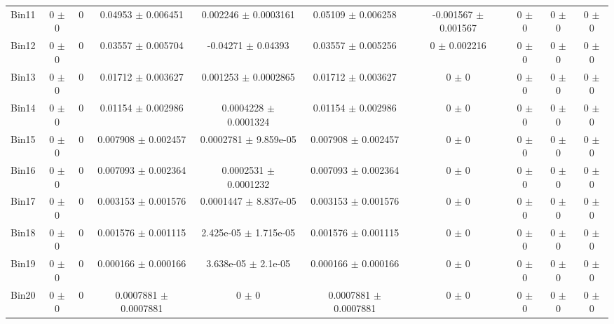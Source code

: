 \begin{tabular}{@{\extracolsep{4pt}}lccccccccc@{}}
     Bin11 & 0 $\pm$ 0 & 0 & 0.04953 $\pm$ 0.006451 & 0.002246 $\pm$ 0.0003161 & 0.05109 $\pm$ 0.006258 & -0.001567 $\pm$ 0.001567 & 0 $\pm$ 0 & 0 $\pm$ 0 & 0 $\pm$ 0 \\ 
     Bin12 & 0 $\pm$ 0 & 0 & 0.03557 $\pm$ 0.005704 & -0.04271 $\pm$ 0.04393 & 0.03557 $\pm$ 0.005256 & 0 $\pm$ 0.002216 & 0 $\pm$ 0 & 0 $\pm$ 0 & 0 $\pm$ 0 \\ 
     Bin13 & 0 $\pm$ 0 & 0 & 0.01712 $\pm$ 0.003627 & 0.001253 $\pm$ 0.0002865 & 0.01712 $\pm$ 0.003627 & 0 $\pm$ 0 & 0 $\pm$ 0 & 0 $\pm$ 0 & 0 $\pm$ 0 \\ 
     Bin14 & 0 $\pm$ 0 & 0 & 0.01154 $\pm$ 0.002986 & 0.0004228 $\pm$ 0.0001324 & 0.01154 $\pm$ 0.002986 & 0 $\pm$ 0 & 0 $\pm$ 0 & 0 $\pm$ 0 & 0 $\pm$ 0 \\ 
     Bin15 & 0 $\pm$ 0 & 0 & 0.007908 $\pm$ 0.002457 & 0.0002781 $\pm$ 9.859e-05 & 0.007908 $\pm$ 0.002457 & 0 $\pm$ 0 & 0 $\pm$ 0 & 0 $\pm$ 0 & 0 $\pm$ 0 \\ 
     Bin16 & 0 $\pm$ 0 & 0 & 0.007093 $\pm$ 0.002364 & 0.0002531 $\pm$ 0.0001232 & 0.007093 $\pm$ 0.002364 & 0 $\pm$ 0 & 0 $\pm$ 0 & 0 $\pm$ 0 & 0 $\pm$ 0 \\ 
     Bin17 & 0 $\pm$ 0 & 0 & 0.003153 $\pm$ 0.001576 & 0.0001447 $\pm$ 8.837e-05 & 0.003153 $\pm$ 0.001576 & 0 $\pm$ 0 & 0 $\pm$ 0 & 0 $\pm$ 0 & 0 $\pm$ 0 \\ 
     Bin18 & 0 $\pm$ 0 & 0 & 0.001576 $\pm$ 0.001115 & 2.425e-05 $\pm$ 1.715e-05 & 0.001576 $\pm$ 0.001115 & 0 $\pm$ 0 & 0 $\pm$ 0 & 0 $\pm$ 0 & 0 $\pm$ 0 \\ 
     Bin19 & 0 $\pm$ 0 & 0 & 0.000166 $\pm$ 0.000166 & 3.638e-05 $\pm$ 2.1e-05 & 0.000166 $\pm$ 0.000166 & 0 $\pm$ 0 & 0 $\pm$ 0 & 0 $\pm$ 0 & 0 $\pm$ 0 \\ 
     Bin20 & 0 $\pm$ 0 & 0 & 0.0007881 $\pm$ 0.0007881 & 0 $\pm$ 0 & 0.0007881 $\pm$ 0.0007881 & 0 $\pm$ 0 & 0 $\pm$ 0 & 0 $\pm$ 0 & 0 $\pm$ 0 \\ 
\hline\hline
  \end{tabular}

